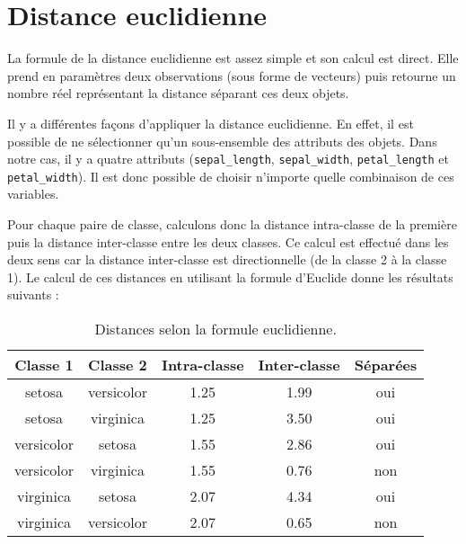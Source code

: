 \documentclass[french]{report}
\begin{document}
    \section{Distance euclidienne}
    
    La formule de la distance euclidienne est assez simple et son calcul est direct.
    Elle prend en paramètres deux observations (sous forme de vecteurs) puis retourne un nombre réel représentant la distance séparant ces deux objets.
    
    Il y a différentes façons d'appliquer la distance euclidienne.
    En effet, il est possible de ne sélectionner qu'un sous-ensemble des attributs des objets.
    Dans notre cas, il y a quatre attributs (\texttt{sepal\_length}, \texttt{sepal\_width}, \texttt{petal\_length} et \texttt{petal\_width}).
    Il est donc possible de choisir n'importe quelle combinaison de ces variables.
    
    Pour chaque paire de classe, calculons donc la distance intra-classe de la première puis la distance inter-classe entre les deux classes.
    Ce calcul est effectué dans les deux sens car la distance inter-classe est directionnelle (de la classe 2 à la classe 1).
    Le calcul de ces distances en utilisant la formule d'Euclide donne les résultats suivants :
    
    \begin{table}[h]
        \centering
        \begin{tabular}{||c c c c c||}
            \hline
            \textbf{Classe 1} & \textbf{Classe 2} & \textbf{Intra-classe} & \textbf{Inter-classe} & \textbf{Séparées} \\
            \hline\hline
            setosa & versicolor & 1.25 & 1.99 & {\color{ForestGreen}oui} \\
            setosa & virginica & 1.25 & 3.50 & {\color{ForestGreen}oui} \\
            \hline
            versicolor & setosa & 1.55 & 2.86 & {\color{ForestGreen}oui} \\
            versicolor & virginica & 1.55 & 0.76 & {\color{BrickRed}non} \\
            \hline
            virginica & setosa & 2.07 & 4.34 & {\color{ForestGreen}oui} \\
            virginica & versicolor & 2.07 & 0.65 & {\color{BrickRed}non} \\
            \hline
        \end{tabular}
        \caption{Distances selon la formule euclidienne.}
    \end{table}
    \leavevmode
    
\end{document}
